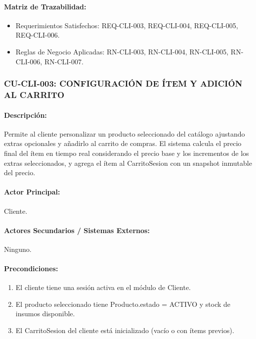 \paragraph{Matriz de Trazabilidad:}
\begin{itemize}
    \item Requerimientos Satisfechos: REQ-CLI-003, REQ-CLI-004, REQ-CLI-005, REQ-CLI-006.
    \item Reglas de Negocio Aplicadas: RN-CLI-003, RN-CLI-004, RN-CLI-005, RN-CLI-006, RN-CLI-007.
\end{itemize}

\subsubsection{CU-CLI-003: CONFIGURACIÓN DE ÍTEM Y ADICIÓN AL CARRITO}
\paragraph{Descripción:} Permite al cliente personalizar un producto seleccionado del catálogo ajustando extras opcionales y añadirlo al carrito de compras. El sistema calcula el precio final del ítem en tiempo real considerando el precio base y los incrementos de los extras seleccionados, y agrega el ítem al CarritoSesion con un snapshot inmutable del precio.

\paragraph{Actor Principal:} Cliente.

\paragraph{Actores Secundarios / Sistemas Externos:} Ninguno.

\paragraph{Precondiciones:}
\begin{enumerate}
    \item[I.] El cliente tiene una sesión activa en el módulo de Cliente.
    \item[II.] El producto seleccionado tiene Producto.estado = ACTIVO y stock de insumos disponible.
    \item[III.] El CarritoSesion del cliente está inicializado (vacío o con ítems previos).
\end{enumerate}

